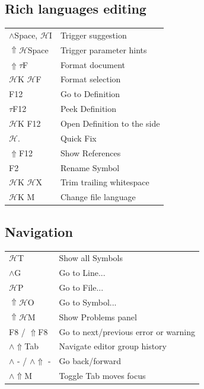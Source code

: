 \documentclass[UTF8]{article}
\begin{document}
\subsection*{Rich languages editing}
\begin{tabular}{ll}
$\wedge$Space, $\mathscr{H}$I & Trigger suggestion \\
$\Uparrow\mathscr{H}$Space & Trigger parameter hints \\
$\Uparrow\tau$F & Format document \\
$\mathscr{H}$K $\mathscr{H}$F & Format selection \\
F12 & Go to Definition \\
$\tau$F12 & Peek Definition \\
$\mathscr{H}$K F12 & Open Definition to the side \\
$\mathscr{H}.$ & Quick Fix \\
$\Uparrow$F12 & Show References \\
F2 & Rename Symbol \\
$\mathscr{H}$K $\mathscr{H}$X & Trim trailing whitespace \\
$\mathscr{H}$K M & Change file language
\end{tabular}

\subsection*{Navigation}
\begin{tabular}{ll}
$\mathscr{H}$T & Show all Symbols \\
$\wedge$G & Go to Line... \\
$\mathscr{H}$P & Go to File... \\
$\Uparrow\mathscr{H}$O & Go to Symbol... \\
$\Uparrow\mathscr{H}$M & Show Problems panel \\
F8 / $\Uparrow$F8 & Go to next/previous error or warning \\
$\wedge\Uparrow$Tab & Navigate editor group history \\
$\wedge$ - / $\wedge\Uparrow$ - & Go back/forward \\
$\wedge\Uparrow$M & Toggle Tab moves focus
\end{tabular}
\end{document}
